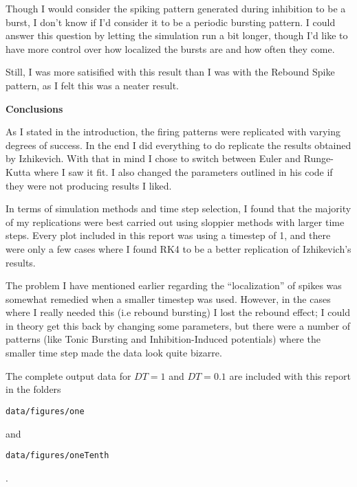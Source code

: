\documentclass[a4paper,12pt]{article}
\begin{document}
Though I would consider the spiking pattern generated during inhibition to be a burst, I don't know if I'd consider it to be a periodic bursting pattern. I could answer this question by letting the simulation run a bit longer, though I'd like to have more control over how localized the bursts are and how often they come. 

\vspace{2mm}

Still, I was more satisified with this result than I was with the Rebound Spike pattern, as I felt this was a neater result. 

\vfil\eject

{\bf Conclusions}
\bigskip

As I stated in the introduction, the firing patterns were replicated with varying degrees of success. In the end I did everything to do replicate the results obtained by Izhikevich. With that in mind I chose to switch between Euler and Runge-Kutta where I saw it fit. I also changed the parameters outlined in his code if they were not producing results I liked. 

\vspace{2mm}

In terms of simulation methods and time step selection, I found that the majority of my replications were best carried out using sloppier methods with larger time steps. Every plot included in this report was using a timestep of 1, and there were only a few cases where I found RK4 to be a better replication of Izhikevich's results. 

\vspace{2mm}

The problem I have mentioned earlier regarding the ``localization'' of spikes was somewhat remedied when a smaller timestep was used. However, in the cases where I really needed this (i.e rebound bursting) I lost the rebound effect; I could in theory get this back by changing some parameters, but there were a number of patterns (like Tonic Bursting and Inhibition-Induced potentials) where the smaller time step made the data look quite bizarre. 

\vspace{2mm}

The complete output data for $DT=1$ and $DT=0.1$ are included with this report in the folders \begin{verbatim}data/figures/one\end{verbatim} and \begin{verbatim}data/figures/oneTenth\end{verbatim}. 
\end{document}
